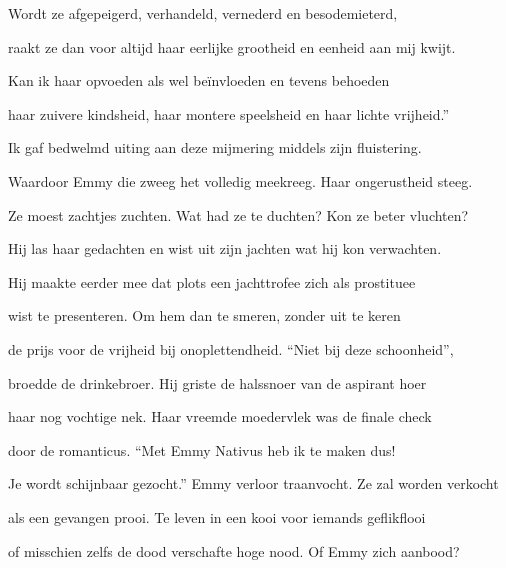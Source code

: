 Wordt ze afgepeigerd,
verhandeld, vernederd
en besodemieterd,

raakt ze dan voor altijd
haar eerlijke grootheid
en eenheid aan mij kwijt.

Kan ik haar opvoeden
als wel beïnvloeden
en tevens behoeden

haar zuivere kindsheid,
haar montere speelsheid
en haar lichte vrijheid.”

Ik gaf bedwelmd uiting
aan deze mijmering
middels zijn fluistering.

Waardoor Emmy die zweeg
het volledig meekreeg.
Haar ongerustheid steeg.

Ze moest zachtjes zuchten.
Wat had ze te duchten?
Kon ze beter vluchten?

Hij las haar gedachten
en wist uit zijn jachten
wat hij kon verwachten.

Hij maakte eerder mee
dat plots een jachttrofee
zich als prostituee

wist te presenteren.
Om hem dan te smeren,
zonder uit te keren

de prijs voor de vrijheid
bij onoplettendheid.
“Niet bij deze schoonheid”,

broedde de drinkebroer.
Hij griste de halssnoer
van de aspirant hoer

haar nog vochtige nek.
Haar vreemde moedervlek
was de finale check

door de romanticus.
“Met Emmy Nativus
heb ik te maken dus!

Je wordt schijnbaar gezocht.”
Emmy verloor traanvocht.
Ze zal worden verkocht

als een gevangen prooi.
Te leven in een kooi
voor iemands geflikflooi

of misschien zelfs de dood
verschafte hoge nood.
Of Emmy zich aanbood?
